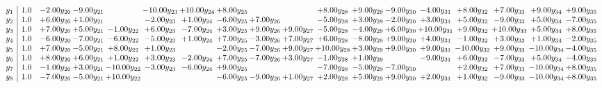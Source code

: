 \documentclass[9pt]{article}
\begin{document}
\[\begin{array}{c| c c@{\hskip 2pt} c@{\hskip 2pt} c@{\hskip 2pt} c@{\hskip 2pt} c@{\hskip 2pt} c@{\hskip 2pt} c@{\hskip 2pt} c@{\hskip 2pt} c@{\hskip 2pt} c@{\hskip 2pt} c@{\hskip 2pt} c@{\hskip 2pt} c@{\hskip 2pt} c@{\hskip 2pt} c@{\hskip 2pt} c@{\hskip 2pt} }
 y_{1}   &  1.0 & -2.00 y_{20} & -9.00 y_{21} &   & -10.00 y_{23} & + 10.00 y_{24} & +  8.00 y_{25} &    &   & +  8.00 y_{28} & +  9.00 y_{29} & -9.00 y_{30} & -4.00 y_{31} & +  8.00 y_{32} & +  7.00 y_{33} & +  9.00 y_{34} & +  9.00 y_{35}\\
 y_{2}   &  1.0 & +  6.00 y_{20} & +  1.00 y_{21} &   & -2.00 y_{23} & +  1.00 y_{24} & -6.00 y_{25} & +  7.00 y_{26} &   & -5.00 y_{28} & +  3.00 y_{29} & -2.00 y_{30} & +  3.00 y_{31} & +  5.00 y_{32} & -9.00 y_{33} & +  5.00 y_{34} & -7.00 y_{35}\\
 y_{3}   &  1.0 & +  7.00 y_{20} & +  5.00 y_{21} & -1.00 y_{22} & +  6.00 y_{23} & -7.00 y_{24} & +  3.00 y_{25} & +  9.00 y_{26} & +  9.00 y_{27} & -5.00 y_{28} & -4.00 y_{29} & +  6.00 y_{30} & + 10.00 y_{31} & +  9.00 y_{32} & + 10.00 y_{33} & +  5.00 y_{34} & +  8.00 y_{35}\\
 y_{4}   &  1.0 & -6.00 y_{20} & -7.00 y_{21} & -6.00 y_{22} & -5.00 y_{23} & +  1.00 y_{24} & +  7.00 y_{25} & -3.00 y_{26} & +  7.00 y_{27} & +  6.00 y_{28} & -8.00 y_{29} & +  9.00 y_{30} & +  4.00 y_{31} & -1.00 y_{32} & +  3.00 y_{33} & +  1.00 y_{34} & -2.00 y_{35}\\
 y_{5}   &  1.0 & +  7.00 y_{20} & -5.00 y_{21} & +  8.00 y_{22} & +  1.00 y_{23} &   & -2.00 y_{25} & -7.00 y_{26} & +  9.00 y_{27} & + 10.00 y_{28} & +  3.00 y_{29} & +  9.00 y_{30} & +  9.00 y_{31} & -10.00 y_{32} & +  9.00 y_{33} & -10.00 y_{34} & -4.00 y_{35}\\
 y_{6}   &  1.0 & +  8.00 y_{20} & +  6.00 y_{21} & +  1.00 y_{22} & +  3.00 y_{23} & -2.00 y_{24} & +  7.00 y_{25} & -7.00 y_{26} & +  3.00 y_{27} & -1.00 y_{28} & +  1.00 y_{29} &   & -9.00 y_{31} & +  6.00 y_{32} & -7.00 y_{33} & +  5.00 y_{34} & -4.00 y_{35}\\
 y_{7}   &  1.0 & -1.00 y_{20} & +  3.00 y_{21} & -10.00 y_{22} & -3.00 y_{23} & -6.00 y_{24} & +  9.00 y_{25} &    &   & -7.00 y_{28} & -5.00 y_{29} & -7.00 y_{30} &   & +  2.00 y_{32} & +  7.00 y_{33} & -10.00 y_{34} & +  8.00 y_{35}\\
 y_{8}   &  1.0 & -7.00 y_{20} & -5.00 y_{21} & + 10.00 y_{22} &    &   & -6.00 y_{25} & -9.00 y_{26} & +  1.00 y_{27} & +  2.00 y_{28} & +  5.00 y_{29} & +  9.00 y_{30} & +  2.00 y_{31} & +  1.00 y_{32} & -9.00 y_{33} & -10.00 y_{34} & +  8.00 y_{35}\\

\end{array}\]
\end{document}
